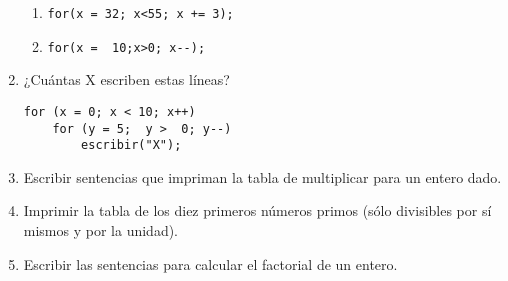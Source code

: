 \begin{enumerate}
\begin{enumerate}[label=\alph*.]
	\item 
\begin{lstlisting}
for(x = 32; x<55; x += 3);
\end{lstlisting}

	\item 
\begin{lstlisting}
for(x =  10;x>0; x--);
\end{lstlisting}
\end{enumerate}
\item ¿Cuántas X escriben estas líneas?
\begin{lstlisting}
for (x = 0; x < 10; x++)
    for (y = 5;  y >  0; y--)
        escribir("X");
\end{lstlisting}
\item Escribir sentencias que impriman la tabla de multiplicar para un entero
dado.
\item Imprimir la tabla de los diez primeros números primos (sólo divisibles por
sí mismos y por la unidad).
\item Escribir las sentencias para calcular el factorial de un entero.
\end{enumerate}
